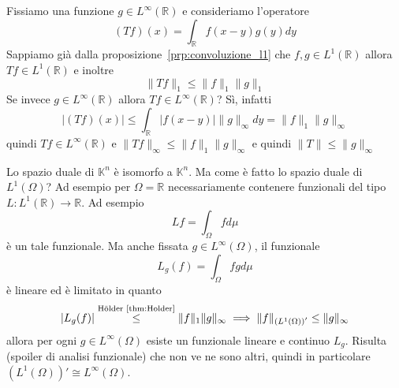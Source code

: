 \begin{example}
    Fissiamo una funzione \(g \in L^{\infty}{(\mathbb{R})}\) e consideriamo
    l'operatore 
    \[
        (Tf)(x)= \int_{\mathbb{R}} f{(x - y)}g{(y)}dy
    \]
    Sappiamo già dalla proposizione~\ref{prp:convoluzione_l1} che \(f, g \in
    L^{1}{(\mathbb{R})}\) allora \(Tf \in L^{1}{(\mathbb{R})}\) e inoltre 
    \[
      \|Tf\|_1 \le  \|f\|_1\|g\|_1
    \]
    Se invece \(g \in L^{\infty}{(\mathbb{R})}\) allora \(Tf \in
    L^{\infty}{(\mathbb{R})}\)? Sì, infatti 
    \[
      |(Tf){(x)}| \le \int_{\mathbb{R}} |f{(x-y)}| \|g\|_{\infty} dy = \|f\|_1
      \|g\|_{\infty} 
    \]
    quindi \(Tf \in L^{\infty}{(\mathbb{R})}\) e \(\|Tf\|_\infty \le \|f\|_1
    \|g\|_\infty\) e quindi \(\|T\| \le \|g\|_\infty\) 
\end{example}
\begin{example}
    Lo spazio duale di \(\mathbb{K}^{n}\) è isomorfo a \(\mathbb{K}^{n}\). Ma
    come è fatto lo spazio duale di \(L^{1}{(\Omega)}\)? Ad esempio per \(\Omega
    = \mathbb{R}\) necessariamente contenere funzionali del tipo \(L :
    L^{1}{(\mathbb{R})} \to \mathbb{R}\). Ad esempio 
    \[
      Lf = \int_{\Omega} f d\mu
    \]
    è un tale funzionale. Ma anche fissata \(g \in L^{\infty}{(\Omega)}\), il
    funzionale
    \[
      L_g{(f)} = \int_{\Omega} fg d\mu
    \]
    è lineare ed è limitato in quanto
    \[
        |L_g{(f)}| \overset{\text{Hölder~\ref{thm:Holder}}}{\le } \|f\|_1 \|g\|_\infty \implies
      \|f\|_{{\left( L^{1}{(\Omega)} \right)}'}  \le \|g\|_\infty
    \]
    allora per ogni \(g \in L^{\infty}{(\Omega)}\) esiste un funzionale lineare
    e continuo \(L_g\). Risulta (spoiler di analisi funzionale) che non ve ne
    sono altri, quindi in particolare \({\left( L^{1}{(\Omega)} \right)}'
    \cong L^{\infty}{(\Omega)}\).
\end{example}
